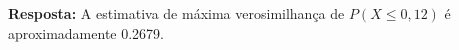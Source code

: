 \documentclass[a4paper,12pt]{article}
\begin{document}
\begin{enumerate}
\begin{mdframed}[backgroundcolor=gray!10, linewidth=0pt, innertopmargin=10pt, innerbottommargin=10pt]
    \textbf{Resposta:} A estimativa de máxima verosimilhança de \( P(X \leq 0{,}12) \) é aproximadamente 0.2679.
    \end{mdframed}

\end{enumerate}
\end{document}
